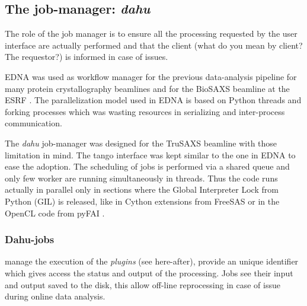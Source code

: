 \documentclass[preprint]{iucr}              %
\begin{document}
\subsection{The job-manager: \textit{dahu}}

The role of the job manager is to ensure all the processing requested by the user interface are actually performed and that the client (what do you mean by client? The requestor?) is informed in case of issues. %

EDNA was used as workflow manager for the previous data-analysis pipeline for many protein crystallography beamlines \cite{edna} and for the BioSAXS beamline at the ESRF \cite{BM29ODA}.
The parallelization model used in EDNA is based on Python threads and forking processes which was wasting resources in serializing and inter-process communication. 
 
The \textit{dahu} job-manager was designed for the TruSAXS beamline \cite{id02_2022} with those limitation in mind. 
The tango interface \cite{tango} was kept similar to the one in EDNA to ease the adoption.
The scheduling of jobs is performed via a shared queue and only few worker are running simultaneously in threads.
Thus the code runs actually in parallel only in sections where the Global Interpreter Lock from Python (GIL) is released, like in Cython extensions from FreeSAS or in the OpenCL code from pyFAI \cite{pyFAI_gpu}.

\subsubsection{Dahu-jobs}
manage the execution of the \textit{plugins} (see here-after), provide an unique identifier which gives access the status and output of the processing.
Jobs see their input and output saved to the disk, this allow off-line reprocessing in case of issue during online data analysis.
\end{document}
